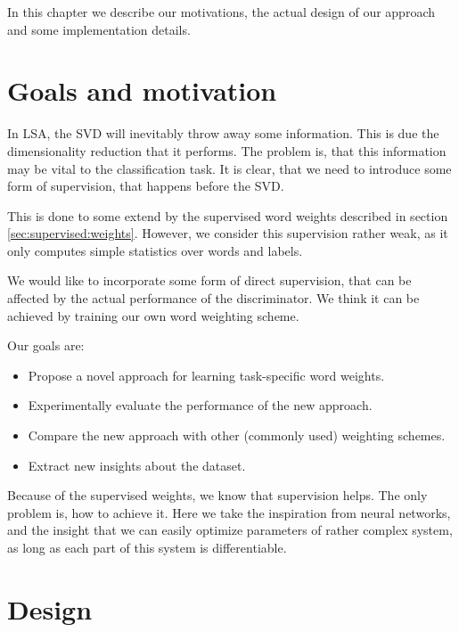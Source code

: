     In this chapter we describe our motivations, the actual design of our approach and some implementation details.
    
    \section{Goals and motivation}
    
    \* %
    \* %

    In LSA, the SVD will inevitably throw away some information. 
    This is due the dimensionality reduction that it performs.
    The problem is, that this information may be vital to the classification task. 
    It is clear, that we need to introduce some form of supervision, that happens before the SVD.
    
    This is done to some extend by the supervised word weights described in section \ref{sec:supervised:weights}. 
    However, we consider this supervision rather weak, as it only computes simple statistics over words and labels.
    
    We would like to incorporate some form of direct supervision, that can be affected by the actual performance of the discriminator.
    We think it can be achieved by training our own word weighting scheme. 
    
    Our goals are:
    \begin{itemize}
        \item Propose a novel approach for learning task-specific word weights.
        \item Experimentally evaluate the performance of the new approach.
        \item Compare the new approach with other (commonly used) weighting schemes. 
        \item Extract new insights about the dataset.
    \end{itemize}
    
    Because of the supervised weights, we know that supervision helps. 
    The only problem is, how to achieve it. 
    Here we take the inspiration from neural networks, and the insight that we can easily optimize parameters of rather complex system, as long as each part of this system is differentiable. 
    
    \section{Design}
    
